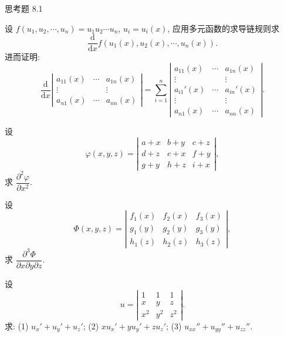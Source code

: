 \begin{exblock}{思考题 8.1}
  \item 设 $f(u_{1}, u_{2}, \cdots, u_{n}) = u_{1}u_{2}\cdots u_{n}$, $u_{i} = u_{i}(x)$, 应用多元函数的求导链规则求
  \[
    \frac{\mathrm{d}}{\mathrm{d}x}f(u_{1}(x), u_{2}(x), \cdots, u_{n}(x)).
  \]
  进而证明:
  \[
    \frac{\mathrm{d}}{\mathrm{d}x}
    \left|\begin{matrix}
      a_{11}(x) & \cdots & a_{1n}(x) \\
      \vdots & & \vdots \\
      a_{n1}(x) & \cdots & a_{nn}(x)
    \end{matrix}\right|
    = \sum_{i = 1}^{n}
    \left|\begin{matrix}
      a_{11}(x) & \cdots & a_{1n}(x) \\
      \vdots & & \vdots \\
      a_{i1}'(x) & \cdots & a_{in}'(x) \\
      \vdots & & \vdots \\
      a_{n1}(x) & \cdots & a_{nn}(x)
    \end{matrix}\right|.
  \]

  \item 设
  \[
    \varphi(x, y, z) = \left|\begin{matrix}
      a + x & b + y & c + z \\
      d + z & e + x & f + y \\
      g + y & h + z & i + x
    \end{matrix}\right|,
  \]
  求 $\dfrac{\partial^{2}\varphi}{\partial x^{2}}$.

  \item 设
  \[
    \Phi(x, y, z) = \left|\begin{matrix}
      f_{1}(x) & f_{2}(x) & f_{3}(x) \\
      g_{1}(y) & g_{2}(y) & g_{3}(y) \\
      h_{1}(z) & h_{2}(z) & h_{3}(z)
    \end{matrix}\right|,
  \]
  求 $\dfrac{\partial^{3}\Phi}{\partial x\partial y\partial z}$.

  \item 设
  \[
    u = \left|\begin{matrix}
      1 & 1 & 1 \\
      x & y & z \\
      x^{2} & y^{2} & z^{2}
    \end{matrix}\right|.
  \]
  求: (1) $u_{x}' + u_{y}' + u_{z}'$; \quad (2) $xu_{x}' + yu_{y}' + zu_{z}'$; \quad (3) $u_{xx}'' + u_{yy}'' + u_{zz}''$.


\end{exblock}
